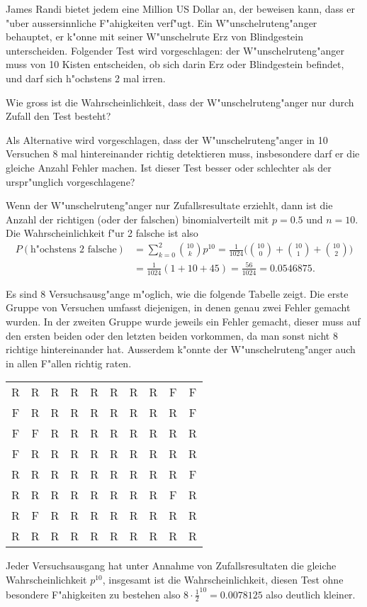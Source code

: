 James Randi bietet jedem eine Million US Dollar an, der beweisen kann,
dass er "uber aussersinnliche F"ahigkeiten verf"ugt. Ein W"unschelruteng"anger
behauptet, er k"onne mit seiner W"unschelrute Erz von Blindgestein
unterscheiden. Folgender Test wird vorgeschlagen: der W"unschelruteng"anger
muss von 10 Kisten entscheiden, ob sich darin Erz oder Blindgestein
befindet, und darf sich h"ochstens 2 mal irren.
\begin{teilaufgaben}
\item
Wie gross ist die
Wahrscheinlichkeit, dass der W"unschelruteng"anger nur durch Zufall
den Test besteht?
\item
Als Alternative wird vorgeschlagen, dass der W"unschelruteng"anger
in 10 Versuchen
8 mal hintereinander richtig detektieren muss, insbesondere darf
er die gleiche Anzahl Fehler machen.
Ist dieser Test
besser oder schlechter als der urspr"unglich vorgeschlagene?
\end{teilaufgaben}

\begin{loesung}
\begin{teilaufgaben}
\item Wenn der W"unschelruteng"anger nur Zufallsresultate erziehlt,
dann ist die Anzahl der richtigen (oder der falschen) binomialverteilt
mit $p=0.5$ und $n=10$. Die Wahrscheinlichkeit f"ur 2 falsche ist also
\begin{align*}
P(\text{h"ochstens 2 falsche})&=\sum_{k=0}^2 \binom{10}{k}p^{10}
=
\frac1{1024}\biggl(
\binom{10}{0}
+
\binom{10}{1}
+
\binom{10}{2}
\biggr)
\\
&=
\frac1{1024}( 1 + 10 + 45)
=\frac{56}{1024}=0.0546875.
\end{align*}
\item Es sind 8 Versuchsausg"ange m"oglich, wie die folgende Tabelle
zeigt. Die erste Gruppe von Versuchen umfasst diejenigen, in denen
genau zwei Fehler gemacht wurden. In der zweiten Gruppe wurde jeweils
ein Fehler gemacht, dieser muss auf den ersten beiden oder den letzten
beiden vorkommen, da man sonst nicht 8 richtige hintereinander hat.
Ausserdem k"onnte der W"unschelruteng"anger auch in allen F"allen richtig
raten.
\begin{center}
\begin{tabular}{cccccccccc}
R&R&R&R&R&R&R&R&F&F\\
F&R&R&R&R&R&R&R&R&F\\
F&F&R&R&R&R&R&R&R&R\\
\hline
F&R&R&R&R&R&R&R&R&R\\
R&R&R&R&R&R&R&R&R&F\\
R&R&R&R&R&R&R&R&F&R\\
R&F&R&R&R&R&R&R&R&R\\
\hline
R&R&R&R&R&R&R&R&R&R
\end{tabular}
\end{center}
Jeder Versuchsausgang hat unter Annahme von Zufallsresultaten die gleiche
Wahrscheinlichkeit
$p^{10}$, insgesamt ist die Wahrscheinlichkeit, diesen Test ohne
besondere F"ahigkeiten zu bestehen also $8\cdot \frac12^{10}=0.0078125$
also deutlich kleiner.
\qedhere
\end{teilaufgaben}
\end{loesung}

